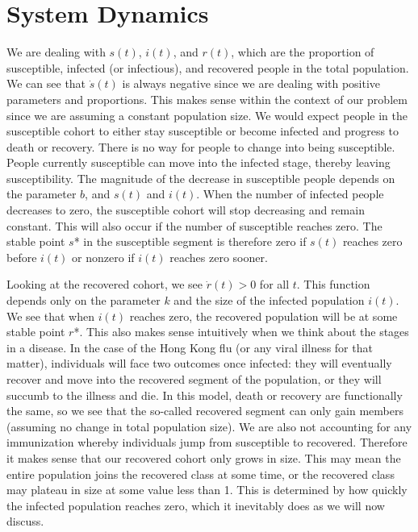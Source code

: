 \documentclass{article}
\begin{document}
\section{System Dynamics}
We are dealing with $s(t)$, $i(t)$, and $r(t)$, which are the proportion of susceptible, infected (or infectious), and recovered people in the total population.  We can see that $\dot{s}(t)$ is always negative since we are dealing with positive parameters and proportions.  This makes sense within the context of our problem since we are assuming a constant population size.  We would expect people in the susceptible cohort to either stay susceptible or become infected and progress to death or recovery.  There is no way for people to change into being susceptible.  People currently susceptible can move into the infected stage, thereby leaving susceptibility.  The magnitude of the decrease in susceptible people depends on the parameter $b$, and $s(t)$ and $i(t)$.  When the number of infected people decreases to zero, the susceptible cohort will stop decreasing and remain constant. This will also occur if the number of susceptible reaches zero.  The stable point $s$\** in the susceptible segment is therefore zero if $s(t)$ reaches zero before $i(t)$ or nonzero if $i(t)$ reaches zero sooner.   

Looking at the recovered cohort, we see $\dot{r}(t)>0$ for all $t$.  This function depends only on the parameter $k$ and the size of the infected population $i(t)$.  We see that when $i(t)$ reaches zero, the recovered population will be at some stable point $r$\**.  This also makes sense intuitively when we think about the stages in a disease.  In the case of the Hong Kong flu (or any viral illness for that matter), individuals will face two outcomes once infected: they will eventually recover and move into the recovered segment of the population, or they will succumb to the illness and die.  In this model, death or recovery are functionally the same, so we see that the so-called recovered segment can only gain members (assuming no change in total population size).  We are also not accounting for any immunization whereby individuals jump from susceptible to recovered.  Therefore it makes sense that our recovered cohort only grows in size.  This may mean the entire population joins the recovered class at some time, or the recovered class may plateau in size at some value less than 1.  This is determined by how quickly the infected population reaches zero, which it inevitably does as we will now discuss.  
\end{document}
